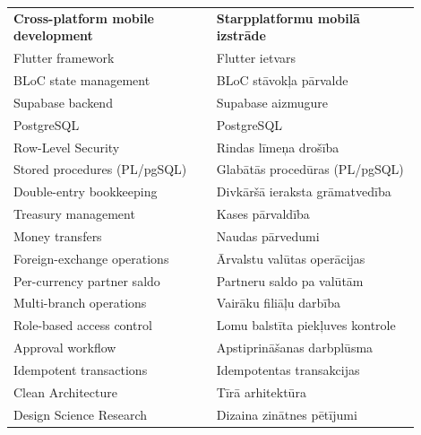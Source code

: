 \frontmatterpage
{}
\begin{tabular}{p{0.45\linewidth}p{0.45\linewidth}}
\textbf{Cross-platform mobile development} & \textbf{Starpplatformu mobilā izstrāde}\\
Flutter framework & Flutter ietvars\\
BLoC state management & BLoC stāvokļa pārvalde\\
Supabase backend & Supabase aizmugure\\
PostgreSQL & PostgreSQL\\
Row-Level Security & Rindas līmeņa drošība\\
Stored procedures (PL/pgSQL) & Glabātās procedūras (PL/pgSQL)\\
Double-entry bookkeeping & Divkāršā ieraksta grāmatvedība\\
Treasury management & Kases pārvaldība\\
Money transfers & Naudas pārvedumi\\
Foreign-exchange operations & Ārvalstu valūtas operācijas\\
Per-currency partner saldo & Partneru saldo pa valūtām\\
Multi-branch operations & Vairāku filiāļu darbība\\
Role-based access control & Lomu balstīta piekļuves kontrole\\
Approval workflow & Apstiprināšanas darbplūsma\\
Idempotent transactions & Idempotentas transakcijas\\
Clean Architecture & Tīrā arhitektūra\\
Design Science Research & Dizaina zinātnes pētījumi\\
\end{tabular}
\clearpage
